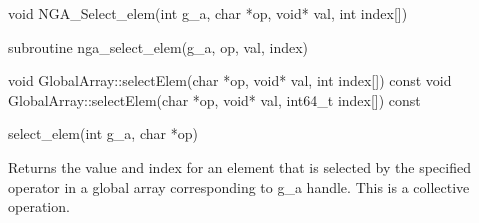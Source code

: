 \documentclass[12pt]{article}
\begin{document}

\begin{capi}
\begin{ccode}

void NGA_Select_elem(int g_a, char *op, void* val, int index[])
\end{ccode}
\begin{funcargs}
\end{funcargs}
\end{capi}

\begin{fapi}
\begin{fcode}
subroutine nga_select_elem(g_a, op, val, index)
\end{fcode}
\begin{funcargs}
\end{funcargs}
\end{fapi}

\begin{cxxapi}
\begin{cxxcode}
void GlobalArray::selectElem(char *op, void* val, int index[]) const
void GlobalArray::selectElem(char *op, void* val, int64_t index[]) const
\end{cxxcode}
\begin{funcargs}
\end{funcargs}
\end{cxxapi}


\begin{pyapi}
\begin{pycode}
select_elem(int g_a, char *op)
\end{pycode}
\end{pyapi}

\gcoll

\begin{desc}

Returns the value and index for an element that is selected by the
specified operator in a global array corresponding to g_a handle.
This is a collective operation.
\end{desc}
\end{document}
